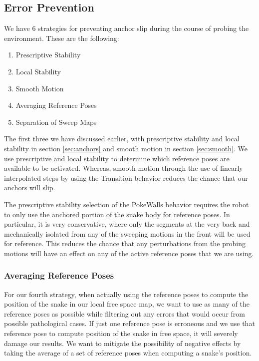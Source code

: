 \subsection{Error Prevention}

We have 6 strategies for preventing anchor slip during the course of probing the environment.  These are the following:

\begin{enumerate} \itemsep 1pt \parskip 0pt \parsep 0pt
  \item Prescriptive Stability
  \item Local Stability
  \item Smooth Motion
  \item Averaging Reference Poses
  \item Separation of Sweep Maps
\end{enumerate}

The first three we have discussed earlier, with prescriptive stability and local stability in section \ref{sec:anchors} and smooth motion in section \ref{sec:smooth}.  We use prescriptive and local stability to determine which reference poses are available to be activated.  Whereas, smooth motion through the use of linearly interpolated steps by using the Transition behavior reduces the chance that our anchors will slip. 

The prescriptive stability selection of the PokeWalls behavior requires the robot to only use the anchored portion of the snake body for reference poses.  In particular, it is very conservative, where only the segments at the very back and mechanically isolated from any of the sweeping motions in the front will be used for reference.  This reduces the chance that any perturbations from the probing motions will have an effect on any of the active reference poses that we are using.

\subsubsection{Averaging Reference Poses}

For our fourth strategy, when actually using the reference poses to compute the position of the snake in our local free space map, we want to use as many of the reference poses as possible while filtering out any errors that would occur from possible pathological cases.   If just one reference pose is erroneous and we use that reference pose to compute position of the snake in free space,  it will severely damage our results.  We want to mitigate the possibility of negative effects by taking the average of a set of reference poses when computing a snake's position.

